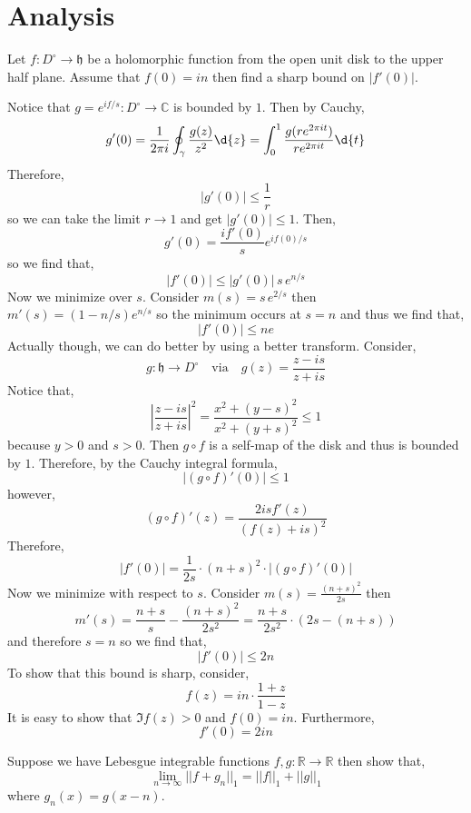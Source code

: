 \documentclass[12pt]{article}
\begin{document}
\section{Analysis}

\begin{exercise}
Let $f : D^\circ \to \mathfrak{h}$ be a holomorphic function from the open unit disk to the upper half plane. Assume that $f(0) = i n$ then find a sharp bound on $|f'(0)|$.
\end{exercise}

Notice that $g = e^{if/s} : D^\circ \to \mathbb{C}$ is bounded by $1$. Then by Cauchy,
\[ g'(0) = \frac{1}{2\pi i} \oint_\gamma \frac{g(z)}{z^2} \d{z} = \int_0^1 \frac{g(r e^{2\pi i t})}{r e^{2 \pi i t}} \d{t} \]
Therefore,
\[ |g'(0)| \le \frac{1}{r} \]
so we can take the limit $r \to 1$ and get $|g'(0)| \le 1$. Then,
\[ g'(0) = \frac{i f'(0)}{s} e^{i f(0)/s} \]
so we find that,
\[ |f'(0)| \le |g'(0)| \, s \, e^{n/s} \] 
Now we minimize over $s$. Consider $m(s) = s \, e^{2/s}$ then $m'(s) = (1 - n / s) e^{n/s}$ so the minimum occurs at $s = n$ and thus we find that,
\[ |f'(0)| \le n e \]
Actually though, we can do better by using a better transform. Consider,
\[ g : \mathfrak{h} \to D^\circ \quad \text{via} \quad g(z) = \frac{z - i s}{z + i s} \]
Notice that,
\[ \left| \frac{z - i s}{z + i s} \right|^2 = \frac{x^2 + (y - s)^2}{x^2 + (y + s)^2} \le 1 \]
because $y > 0$ and $s > 0$.
Then $g \circ f$ is a self-map of the disk and thus is bounded by $1$.  Therefore, by the Cauchy integral formula,
\[ |(g \circ f)'(0)| \le 1 \]
however,
\[ (g \circ f)'(z) = \frac{2 i s f'(z)}{(f(z) + i s)^2} \]
Therefore, 
\[ |f'(0)| = \frac{1}{2s} \cdot (n + s)^2 \cdot |(g \circ f)'(0)| \] 
Now we minimize with respect to $s$. Consider $m(s) = \frac{(n + s)^2}{2 s}$ then
\[ m'(s) = \frac{n + s}{s} - \frac{(n + s)^2}{2s^2} = \frac{n + s}{2 s^2} \cdot \left( 2 s - (n + s) \right)  \]
and therefore $s = n$ so we find that,
\[ |f'(0)| \le 2 n \]
To show that this bound is sharp, consider,
\[ f(z) = i n \cdot \frac{1 + z}{1 - z} \]
It is easy to show that $\Im{f(z)} > 0$ and $f(0) = i n$. Furthermore,
\[ f'(0) = 2 i n \]

\newcommand{\R}{\mathbb{R}}

\begin{exercise}
Suppose we have Lebesgue integrable functions $f,g : \R \to \R$ then show that,
\[ \lim_{n \to \infty} || f + g_n ||_{1} = || f ||_{1} + || g ||_{1} \]
where $g_n(x) = g(x - n)$.
\end{exercise}
\end{document}
